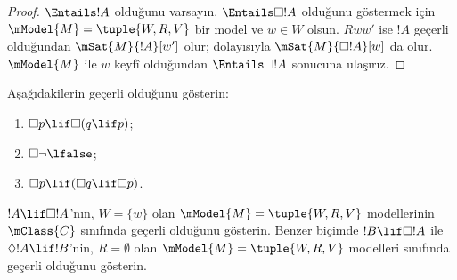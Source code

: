 \begin{proof}
  $\Entails !A$ olduğunu varsayın. $\Entails \Box!A$ olduğunu göstermek
  için $\mModel{M} = \tuple{W, R, V}$ bir model ve $w \in W$ olsun.
  $Rww'$ ise $!A$ geçerli olduğundan $\mSat{M}{!A}[w']$ olur; dolayısıyla
  $\mSat{M}{\Box!A}[w]$ da olur. $\mModel{M}$ ile $w$ keyfî olduğundan
  $\Entails \Box!A$ sonucuna ulaşırız.
\end{proof}

\begin{prob}
  Aşağıdakilerin geçerli olduğunu gösterin:
  \begin{enumerate}
  \item $\Box p \lif \Box (q \lif p)$;
  \item $\Box \lnot \lfalse$;
  \item $\Box p \lif (\Box q \lif \Box p)$.
  \end{enumerate}
\end{prob}

\begin{prob}
  $!A \lif \Box!A$'nın, $W = \{w\}$ olan
  $\mModel{M} = \tuple{W, R, V}$ modellerinin $\mClass{C}$ sınıfında geçerli
  olduğunu gösterin. Benzer biçimde $!B \lif \Box !A$ ile
  $\Diamond !A \lif !B$'nin, $R = \emptyset$ olan
  $\mModel{M} = \tuple{W, R, V}$ modelleri sınıfında geçerli olduğunu
  gösterin.
\end{prob}

